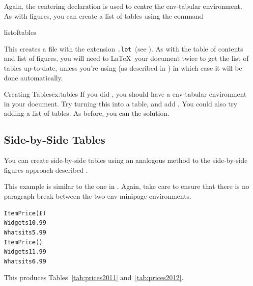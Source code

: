 Again, the \gls{centering} declaration is used to centre the
\gls{env-tabular} environment.
As with figures, you can create a list of tables using the command
\begin{definition}
\gls{listoftables}
\end{definition}
This creates a file with the extension \texttt{.lot}\indexLOT\ (see
).
As with the table of contents and list of figures, you will need to
\LaTeX\ your document twice to get the list of tables up-to-date, unless
you're using  (as described in
) in which case it will be done
automatically.

\begin{exercise}{Creating Tables}{ex:tables}
If you did , you should have 
a \gls{env-tabular} environment in your document.  Try
turning this into a table, and add .  
You could also try adding a list of tables.
As before, you can  the solution.
\end{exercise}

\subsection{Side-by-Side Tables}
\label{sec:sidebysidetab}

You can create side-by-side tables using an analogous method to 
the side-by-side figures approach described
.


This example is similar to the one in .
Again, take care to ensure that there is no paragraph break between the
two \gls{env-minipage} environments.
\begin{code}
\begin{alltt}
   Item  Price (\pounds)
   Widgets  10.99
   Whatsits  5.99
   Item  Price ()
   Widgets  11.99
   Whatsits  6.99
\end{alltt}
\end{code}
This produces Tables~\ref{tab:prices2011} and~\vref{tab:prices2012}.

